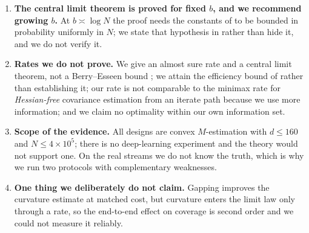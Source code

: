 \begin{enumerate}[label=(L\arabic*),leftmargin=2.6em,itemsep=2pt,topsep=2pt]
for linear models, and $c_D$ has a genuine failure mode on the one design that needs it.
\item \textbf{The central limit theorem is proved for fixed $b$, and we recommend growing $b$.} At
$b\asymp\log N$ the proof needs the constants of  to be bounded in probability uniformly
in $N$; we state that hypothesis in  rather than hide it, and we do not verify it.
\item \textbf{Rates we do not prove.} We give an almost sure rate and a central limit theorem, not a
Berry--Esseen bound \citep{samsonov2025statistical}; we attain the efficiency bound of
\citet{li2023markovian} rather than establishing it; our rate is not comparable to the minimax rate for
\emph{Hessian-free} covariance estimation from an iterate path \citep{ni2026online} because we use more
information; and we claim no optimality within our own information set.
\item \textbf{Scope of the evidence.} All designs are convex $M$-estimation with $d\le160$ and
$N\le4\times10^5$; there is no deep-learning experiment and the theory would not support one. On the real
streams we do not know the truth, which is why we run two protocols with complementary weaknesses.
\item \textbf{One thing we deliberately do not claim.} Gapping improves the curvature estimate at matched
cost, but curvature enters the limit law only through a rate, so the end-to-end effect on coverage is
second order and we could not measure it reliably.
\end{enumerate}
